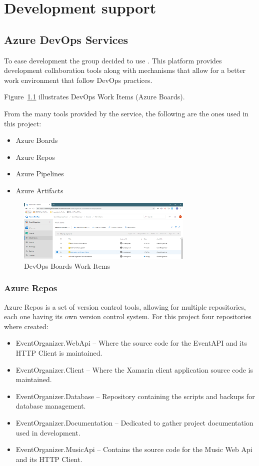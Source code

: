 \chapter{Development support} 
\label{ch:Chapter4}
\vfill \minitoc \newpage

\section{Azure DevOps Services}

To ease development the group decided to use \textit{\cite{azuredevops}}. This platform provides development collaboration tools along with mechanisms that allow for a better work environment that follow DevOps practices.

Figure~\ref{fig:DevopsTasks1} illustrates DevOps Work Items (Azure Boards).

From the many tools provided by the service, the following are the ones used in this project:
\begin{itemize}
	\item Azure Boards
	\item Azure Repos
	\item Azure Pipelines
	\item Azure Artifacts
\end{itemize}


\begin{figure}[!ht]
	\centering
	\includegraphics[width=0.75\textwidth]{./Chapter4/Figures/DevopsTasks1.png}
	\caption{DevOps Boards Work Items}
	\label{fig:DevopsTasks1}
\end{figure}

\subsection{Azure Repos}
Azure Repos is a set of version control tools, allowing for multiple repositories, each one having its own version control system. For this project four repositories where created:

\begin{itemize}
	\item EventOrganizer.WebApi – Where the source code for the EventAPI and its HTTP Client is maintained.
	\item EventOrganizer.Client – Where the Xamarin client application source code is maintained.
	\item EventOrganizer.Database – Repository containing the scripts and backups for database management.
	\item EventOrganizer.Documentation – Dedicated to gather project documentation used in development.
	\item EventOrganizer.MusicApi – Contains the source code for the Music Web Api and its HTTP Client.
\end{itemize}

